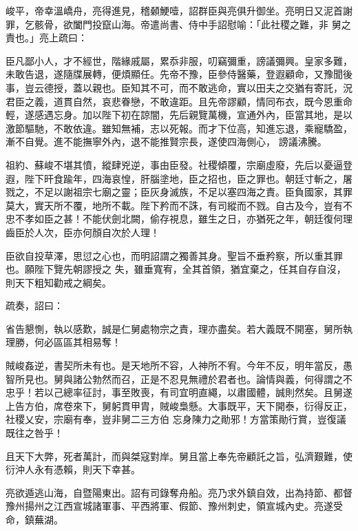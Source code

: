 \begin{pinyinscope}
 峻平，帝幸溫嶠舟，亮得進見，稽顙鯁噎，詔群臣與亮俱升御坐。亮明日又泥首謝罪，乞骸骨，欲闔門投竄山海。帝遣尚書、侍中手詔慰喻：「此社稷之難，非
 舅之責也。」亮上疏曰：



 臣凡鄙小人，才不經世，階緣戚屬，累忝非服，叨竊彌重，謗議彌興。皇家多難，未敢告退，遂隨牒展轉，便煩顯任。先帝不豫，臣參侍醫藥，登遐顧命，又豫聞後事，豈云德授，蓋以親也。臣知其不可，而不敢逃命，實以田夫之交猶有寄託，況君臣之義，道貫自然，哀悲眷戀，不敢違距。且先帝謬顧，情同布衣，既今恩重命輕，遂感遇忘身。加以陛下初在諒闇，先后親覽萬機，宣通外內，臣當其地，是以激節驅馳，不敢依違。雖知無補，志以死報。而才下位高，知進忘退，乘寵驕盈，漸不自覺。進不能撫寧外內，退不能推賢宗長，遂使四海側心，
 謗議沸騰。



 祖約、蘇峻不堪其憤，縱肆兇逆，事由臣發。社稷傾覆，宗廟虛廢，先后以憂逼登遐，陛下旰食踰年，四海哀惶，肝腦塗地，臣之招也，臣之罪也。朝廷寸斬之，屠戮之，不足以謝祖宗七廟之靈；臣灰身滅族，不足以塞四海之責。臣負國家，其罪莫大，實天所不覆，地所不載。陛下矜而不誅，有司縱而不戮。自古及今，豈有不忠不孝如臣之甚！不能伏劍北闕，偷存視息，雖生之日，亦猶死之年，朝廷復何理齒臣於人次，臣亦何顏自次於人理！



 臣欲自投草澤，思愆之心也，而明詔謂之獨善其身。聖旨不垂矜察，所以重其罪也。願陛下覽先朝謬授之
 失，雖垂寬宥，全其首領，猶宜棄之，任其自存自沒，則天下粗知勸戒之綱矣。



 疏奏，詔曰：



 省告懇惻，執以感歎，誠是仁舅處物宗之責，理亦盡矣。若大義既不開塞，舅所執理勝，何必區區其相易奪！



 賊峻姦逆，書契所未有也。是天地所不容，人神所不宥。今年不反，明年當反，愚智所見也。舅與諸公勃然而召，正是不忍見無禮於君者也。論情與義，何得謂之不忠乎！若以己總率征討，事至敗喪，有司宜明直繩，以肅國體，誠則然矣。且舅遂上告方伯，席卷來下，舅躬貫甲胄，賊峻梟懸。大事既平，天下開泰，衍得反正，社稷乂安，宗廟有奉，豈非舅二三方伯
 忘身陳力之勛邪！方當策勛行賞，豈復議既往之咎乎！



 且天下大弊，死者萬計，而與桀寇對岸。舅且當上奉先帝顧託之旨，弘濟艱難，使衍沖人永有憑賴，則天下幸甚。



 亮欲遁逃山海，自暨陽東出。詔有司錄奪舟船。亮乃求外鎮自效，出為持節、都督豫州揚州之江西宣城諸軍事、平西將軍、假節、豫州刺史，領宣城內史。亮遂受命，鎮蕪湖。




\end{pinyinscope}
